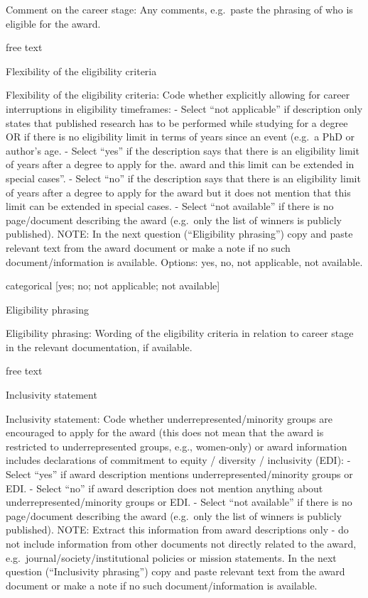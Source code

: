 \documentclass[
]{article}
\begin{document}
Comment on the career stage: Any comments, e.g.~paste the phrasing of
who is eligible for the award.

free text

Flexibility of the eligibility criteria

Flexibility of the eligibility criteria: Code whether explicitly
allowing for career interruptions in eligibility timeframes: - Select
``not applicable'' if description only states that published research
has to be performed while studying for a degree OR if there is no
eligibility limit in terms of years since an event (e.g.~a PhD or
author's age. - Select ``yes'' if the description says that there is an
eligibility limit of years after a degree to apply for the. award and
this limit can be extended in special cases''. - Select ``no'' if the
description says that there is an eligibility limit of years after a
degree to apply for the award but it does not mention that this limit
can be extended in special cases. - Select ``not available'' if there is
no page/document describing the award (e.g.~only the list of winners is
publicly published). NOTE: In the next question (``Eligibility
phrasing'') copy and paste relevant text from the award document or make
a note if no such document/information is available. Options: yes, no,
not applicable, not available.

categorical {[}yes; no; not applicable; not available{]}

Eligibility phrasing

Eligibility phrasing: Wording of the eligibility criteria in relation to
career stage in the relevant documentation, if available.

free text

Inclusivity statement

Inclusivity statement: Code whether underrepresented/minority groups are
encouraged to apply for the award (this does not mean that the award is
restricted to underrepresented groups, e.g., women-only) or award
information includes declarations of commitment to equity / diversity /
inclusivity (EDI): - Select ``yes'' if award description mentions
underrepresented/minority groups or EDI. - Select ``no'' if award
description does not mention anything about underrepresented/minority
groups or EDI. - Select ``not available'' if there is no page/document
describing the award (e.g.~only the list of winners is publicly
published). NOTE: Extract this information from award descriptions only
- do not include information from other documents not directly related
to the award, e.g.~journal/society/institutional policies or mission
statements. In the next question (``Inclusivity phrasing'') copy and
paste relevant text from the award document or make a note if no such
document/information is available.
\end{document}
